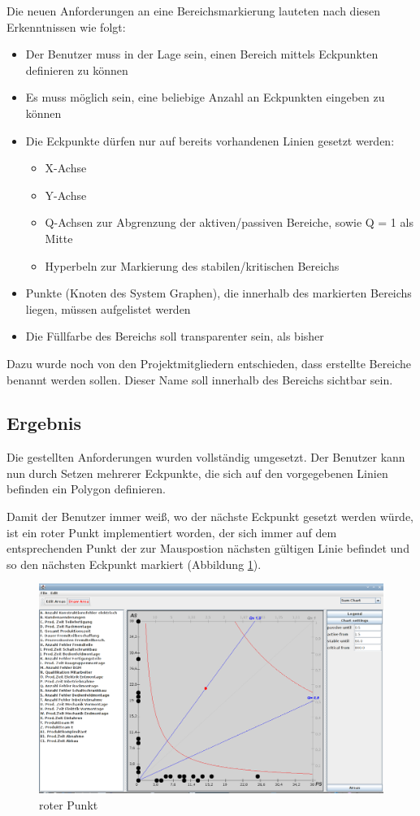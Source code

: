 Die neuen Anforderungen an eine Bereichsmarkierung lauteten nach diesen Erkenntnissen wie folgt:
\begin{itemize}
  \item Der Benutzer muss in der Lage sein, einen Bereich mittels Eckpunkten definieren zu können
  \item Es muss möglich sein, eine beliebige Anzahl an Eckpunkten eingeben zu können
  \item Die Eckpunkte dürfen nur auf bereits vorhandenen Linien gesetzt werden:
  \begin{itemize}
    \item X-Achse
    \item Y-Achse
    \item Q-Achsen zur Abgrenzung der aktiven/passiven Bereiche, sowie Q = 1 als Mitte
    \item Hyperbeln zur Markierung des stabilen/kritischen Bereichs
  \end{itemize}
  \item Punkte (Knoten des System Graphen), die innerhalb des markierten Bereichs liegen, müssen aufgelistet werden
  \item Die Füllfarbe des Bereichs soll transparenter sein, als bisher
\end{itemize}

Dazu wurde noch von den Projektmitgliedern entschieden, dass erstellte Bereiche benannt werden sollen. Dieser Name soll innerhalb des Bereichs sichtbar sein.

\subsection{Ergebnis}

Die gestellten Anforderungen wurden vollständig umgesetzt. Der Benutzer kann nun durch Setzen mehrerer Eckpunkte, die sich auf den vorgegebenen Linien befinden ein Polygon definieren.

Damit der Benutzer immer weiß, wo der nächste Eckpunkt gesetzt werden würde, ist ein roter Punkt implementiert worden, der sich immer auf dem entsprechenden Punkt der zur Mauspostion nächsten gültigen Linie befindet und so den nächsten Eckpunkt markiert (Abbildung \ref{roterPunkt}).
\begin{figure}
	\centering
	\includegraphics[width=1\textwidth]{pictures/roter-punkt.png}
	\caption{roter Punkt}
	\label{roterPunkt}
\end{figure}

